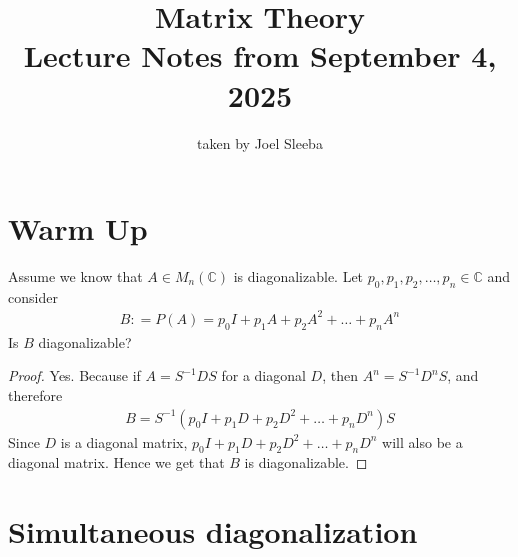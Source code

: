 \documentclass[11pt]{article}
\theoremstyle{plain} %
\theoremstyle{definition} %
\theoremstyle{remark} %
\begin{document}
\title{Matrix Theory\\ Lecture Notes from September 4, 2025}
\date{}
\author{
  taken by Joel Sleeba
}

\maketitle

\section{Warm Up}
Assume we know that $A \in M_n(\mathbb{C})$ is diagonalizable. Let
$p_0, p_1 , p_2 , \ldots , p_n \in \mathbb{C}$ and consider
\begin{align*}
  B: = P(A) = p_0 I + p_1 A + p_2A^2 + \ldots + p_nA^n
\end{align*}
Is $B$ diagonalizable?
\begin{proof}
  Yes. Because if $A = S^{-1}DS$ for a diagonal $D$, then $A^n =
  S^{-1}D^n S$, and therefore
  \begin{align*}
    B = S^{-1} (p_0 I  + p_1D + p_2D^2 + \ldots + p_nD^n)S
  \end{align*}
  Since $D$ is a diagonal matrix, $p_0 I  + p_1D + p_2D^2 + \ldots +
  p_nD^n$ will also be a diagonal matrix. Hence we get that $B$ is
  diagonalizable.
\end{proof}

\section{Simultaneous diagonalization}
\end{document}

